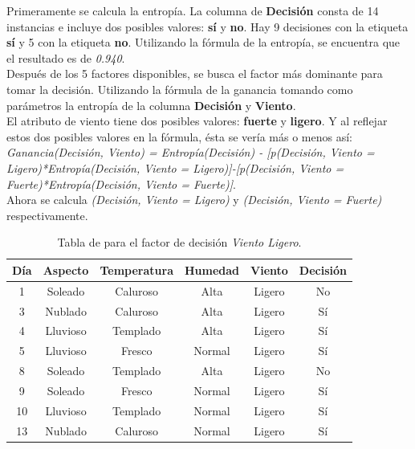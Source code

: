 \begin{UClist}
	\UCli Primeramente se calcula la entropía. La columna de \textbf{Decisión} consta de 14 instancias e incluye dos posibles valores: \textbf{sí} y \textbf{no}. Hay 9 decisiones con la etiqueta \textbf{sí} y 5 con la etiqueta \textbf{no}. Utilizando la fórmula de la entropía, se encuentra que el resultado es de \emph{0.940}.\\
	\UCli Después de los 5 factores disponibles, se busca el factor más dominante para tomar la decisión. Utilizando la fórmula de la ganancia tomando como parámetros la entropía de la columna \textbf{Decisión} y \textbf{Viento}.\\
	\UCli El atributo de viento tiene dos posibles valores: \textbf{fuerte} y \textbf{ligero}. Y al reflejar estos dos posibles valores en la fórmula, ésta se vería más o menos así: \emph{Ganancia(Decisión, Viento) = Entropía(Decisión) - [p(Decisión, Viento = Ligero)*Entropía(Decisión, Viento = Ligero)]-[p(Decisión, Viento = Fuerte)*Entropía(Decisión, Viento = Fuerte)]}.\\
	\UCli Ahora se calcula \emph{(Decisión, Viento = Ligero)} y \emph{(Decisión, Viento = Fuerte)} respectivamente.\\

	\begin{table}[!hb]
		\begin{center}
			\label{tab:tablaInduccionVientoLigero}
			\begin{tabular}{c|c|c|c|c|c}
				\textbf{Día} & \textbf{Aspecto} & \textbf{Temperatura} & \textbf{Humedad} & \textbf{Viento} & \textbf{Decisión}\\
				\hline
				1 & Soleado & Caluroso & Alta & Ligero & No\\
				3 & Nublado & Caluroso & Alta & Ligero & Sí\\
				4 & Lluvioso & Templado & Alta & Ligero & Sí\\
				5 & Lluvioso & Fresco & Normal & Ligero & Sí\\
				8 & Soleado & Templado & Alta & Ligero & No\\
				9 & Soleado & Fresco & Normal & Ligero & Sí\\
				10 & Lluvioso & Templado & Normal & Ligero & Sí\\
				13 & Nublado & Caluroso & Normal & Ligero & Sí\\
			\end{tabular}
		\end{center}
		\caption{Tabla de para el factor de decisión \emph{Viento Ligero}.}
	\end{table}


\end{UClist}
